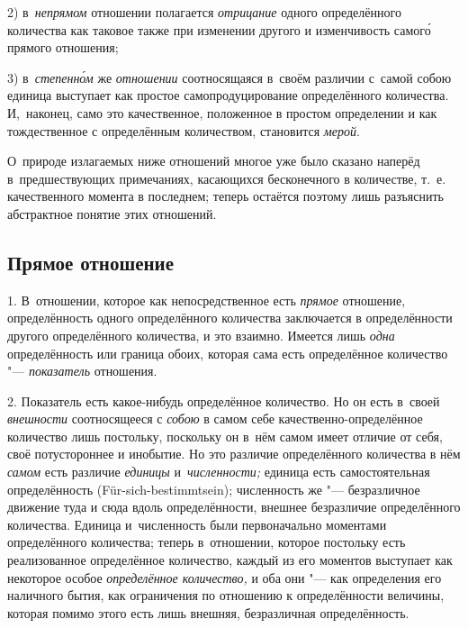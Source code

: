 2) в~{\em непрямом} отношении полагается {\em отрицание} одного определённого
количества как таковое также при изменении другого и изменчивость самог\'{о}
прямого отношения;

3) в~{\em степенн\'{о}м} же {\em отношении} соотносящаяся в~своём различии
с~самой собою единица выступает как простое самопродуцирование определённого
количества. И,~наконец, само это качественное, положенное в простом определении
и как тождественное с определённым количеством, становится {\em мерой}.

О~природе излагаемых ниже отношений многое уже было сказано наперёд
в~предшествующих примечаниях, касающихся бесконечного в количестве, т.~е.
качественного момента в последнем; теперь остаётся поэтому лишь разъяснить
абстрактное понятие этих отношений.

\subsection{Прямое отношение}

1. В~отношении, которое как непосредственное есть {\em прямое} отношение,
определённость одного определённого количества заключается в определённости
другого определённого количества, и это взаимно. Имеется лишь {\em одна}
определённость или граница обоих, которая сама есть определённое количество
"--- {\em показатель} отношения.

2. Показатель есть какое-нибудь определённое количество. Но он есть в~своей
{\em внешности} соотносящееся с {\em собою} в самом себе
качественно-определённое количество лишь постольку, поскольку он в~нём самом
имеет отличие от себя, своё потустороннее и инобытие. Но это различие
определённого количества в нём {\em самом} есть различие {\em единицы}
и~{\em численности;} единица есть самостоятельная определённость
(Für-sich-bestimmt\-sein); численность же "--- безразличное движение туда и
сюда вдоль определённости, внешнее безразличие определённого количества.
Единица и~численность были первоначально моментами определённого количества;
теперь в~отношении, которое постольку есть реализованное определённое
количество, каждый из его моментов выступает как некоторое особое
{\em определённое количество,} и оба они "--- как определения его наличного
бытия, как ограничения по отношению к определённости величины, которая помимо
этого есть лишь внешняя, безразличная определённость.

